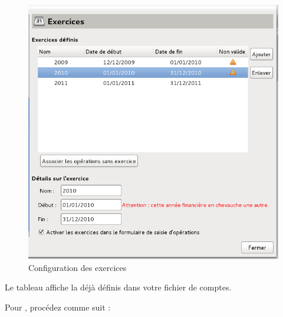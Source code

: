 \ifIllustration
\begin{figure}[ht]
\begin{center}
\includegraphics[scale=0.5]{image/screenshot/setup_financialyear}
\end{center}
\caption{Configuration des exercices}
\label{setup-financialyear-img}
\end{figure}
\fi

Le tableau  affiche la  déjà définis dans votre fichier de comptes.

Pour , procédez comme suit :

